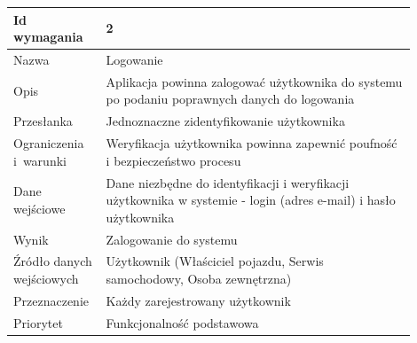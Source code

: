 \documentclass[12pt]{article}
\begin{document}
\begin{table}[H]
\begin{center}
\end{center}
	\begin{tabular}{|p{0.18\linewidth}|p{0.72\linewidth}|}%
	\hline
	Id wymagania 	& 2 				\\ \hline
	Nazwa			& Logowanie \\ \hline
	Opis & Aplikacja powinna zalogować użytkownika do systemu po
podaniu poprawnych danych do logowania
\\ \hline
	Przesłanka & Jednoznaczne zidentyfikowanie użytkownika  \\ \hline
	Ograniczenia i~warunki & Weryfikacja użytkownika powinna zapewnić poufność i bezpieczeństwo procesu  \\ \hline
	Dane wejściowe & Dane niezbędne do identyfikacji i weryfikacji użytkownika
w systemie - login (adres e-mail) i hasło użytkownika
  \\ \hline
	Wynik & Zalogowanie do systemu \\ \hline
	Źródło danych wejściowych & Użytkownik (Właściciel pojazdu, Serwis samochodowy, Osoba zewnętrzna) \\ \hline
	Przeznaczenie & Każdy zarejestrowany użytkownik \\ \hline
	Priorytet & Funkcjonalność podstawowa \\ \hline
	\end{tabular}

\end{table}
\end{document}
